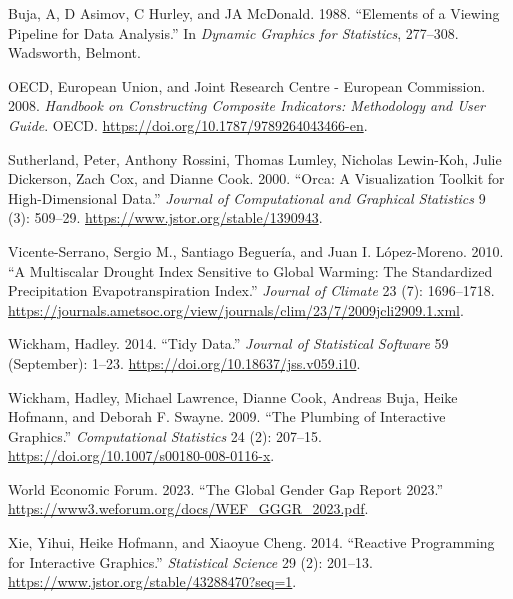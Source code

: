 \documentclass[
]{interact}
\newlength{\cslhangindent}
\newlength{\cslentryspacingunit} %
\newenvironment{CSLReferences}[2] %
 {%
  \setlength{\parindent}{0pt}
  \ifodd #1
  \let\oldpar\par
  \def\par{\hangindent=\cslhangindent\oldpar}
  \fi
  \setlength{\parskip}{#2\cslentryspacingunit}
 }%
 {}
\begin{document}
\hypertarget{refs}{}
\begin{CSLReferences}{1}{0}
\leavevmode{}%
Buja, A, D Asimov, C Hurley, and JA McDonald. 1988. {``Elements of a
Viewing Pipeline for Data Analysis.''} In \emph{Dynamic Graphics for
Statistics}, 277--308. Wadsworth, Belmont.

\leavevmode{}%
OECD, European Union, and Joint Research Centre - European Commission.
2008. \emph{Handbook on {Constructing} {Composite} {Indicators}:
{Methodology} and {User} {Guide}}. OECD.
\url{https://doi.org/10.1787/9789264043466-en}.

\leavevmode{}%
Sutherland, Peter, Anthony Rossini, Thomas Lumley, Nicholas Lewin-Koh,
Julie Dickerson, Zach Cox, and Dianne Cook. 2000. {``Orca: {A}
{Visualization} {Toolkit} for {High}-{Dimensional} {Data}.''}
\emph{Journal of Computational and Graphical Statistics} 9 (3): 509--29.
\url{https://www.jstor.org/stable/1390943}.

\leavevmode{}%
Vicente-Serrano, Sergio M., Santiago Beguería, and Juan I. López-Moreno.
2010. {``A {Multiscalar} {Drought} {Index} {Sensitive} to {Global}
{Warming}: {The} {Standardized} {Precipitation} {Evapotranspiration}
{Index}.''} \emph{Journal of Climate} 23 (7): 1696--1718.
\url{https://journals.ametsoc.org/view/journals/clim/23/7/2009jcli2909.1.xml}.

\leavevmode{}%
Wickham, Hadley. 2014. {``Tidy {Data}.''} \emph{Journal of Statistical
Software} 59 (September): 1--23.
\url{https://doi.org/10.18637/jss.v059.i10}.

\leavevmode{}%
Wickham, Hadley, Michael Lawrence, Dianne Cook, Andreas Buja, Heike
Hofmann, and Deborah F. Swayne. 2009. {``The Plumbing of Interactive
Graphics.''} \emph{Computational Statistics} 24 (2): 207--15.
\url{https://doi.org/10.1007/s00180-008-0116-x}.

\leavevmode{}%
World Economic Forum. 2023. {``{The Global Gender Gap Report 2023}.''}
\url{https://www3.weforum.org/docs/WEF_GGGR_2023.pdf}.

\leavevmode{}%
Xie, Yihui, Heike Hofmann, and Xiaoyue Cheng. 2014. {``Reactive
{Programming} for {Interactive} {Graphics}.''} \emph{Statistical
Science} 29 (2): 201--13.
\url{https://www.jstor.org/stable/43288470?seq=1}.

\end{CSLReferences}
\end{document}
